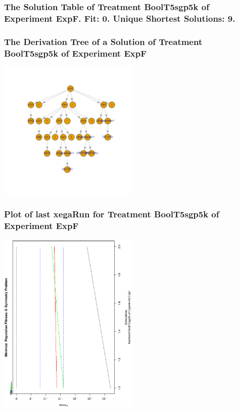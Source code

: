 \documentclass[18pt,c]{beamer}
\begin{document}
 \begin{frame}
 \fontsize{8pt}{9pt}\selectfont
 \frametitle{ The Solution Table of Treatment BoolT5sgp5k of Experiment ExpF. Fit: 0. Unique Shortest Solutions: 9. }

 \label{ExpFSolutionTable006.tex}  
 \end{frame}

 \begin{frame}
 \frametitle{ The Derivation Tree of a Solution of Treatment BoolT5sgp5k of Experiment ExpF }
 \begin{center}
\includegraphics[width=0.5\textwidth, angle=0]
{ExpFDerivationTreeFigure006.pdf}
 \end{center}
 \label{report/ExpFDerivationTreeFigure006.pdf}  
 \end{frame}

 \begin{frame}
 \frametitle{ Plot of last xegaRun for Treatment BoolT5sgp5k of Experiment ExpF }
 \begin{center}
\includegraphics[width=0.5\textwidth, angle=-90]
{ExpFPlotPopStatsFigure006.eps}
 \end{center}
 \label{report/ExpFPlotPopStatsFigure006.eps}  
 \end{frame}
\end{document}
